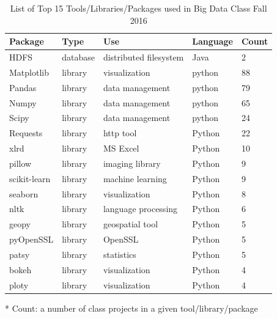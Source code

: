 \documentclass[9pt,twocolumn,twoside]{styles/osajnl}
\begin{document}
\begin{table}[htb]
\begin{center}
\begin{small}
\begin{threeparttable}
\begin{tabular}{l|l|l|l|l}
    Package      & Type     & Use                    & Language & Count\tnote{*} \\ \hline \hline
    HDFS         & database & distributed filesystem & Java     & 2              \\ 
    Matplotlib   & library  & visualization          & python   & 88             \\ \hline
    Pandas       & library  & data management        & python   & 79             \\ \hline
    Numpy        & library  & data management        & python   & 65             \\ \hline
    Scipy        & library  & data management        & python   & 24             \\ \hline
    Requests     & library  & http tool              & Python   & 22             \\ \hline
    xlrd         & library  & MS Excel               & Python   & 10             \\ \hline
    pillow       & library  & imaging library        & Python   & 9              \\ \hline
    scikit-learn & library  & machine learning       & Python   & 9              \\ \hline
    seaborn      & library  & visualization          & Python   & 8              \\ \hline
    nltk         & library  & language processing    & Python   & 6              \\ \hline
    geopy        & library  & geospatial tool        & Python   & 5              \\ \hline
    pyOpenSSL    & library  & OpenSSL                & Python   & 5              \\ \hline
    patsy        & library  & statistics             & Python   & 5              \\ \hline
    bokeh        & library  & visualization          & Python   & 4              \\ \hline
    ploty        & library  & visualization          & Python   & 4              \\ \hline

        \end{tabular}
        \caption{List of Top 15 Tools/Libraries/Packages used in Big
          Data Class Fall 2016}
        \label{tab:tools-sp16}
        \begin{tablenotes}
        \item[*] Count: a number of class projects in a given tool/library/package
        \end{tablenotes}
      \end{threeparttable}
    \end{small}
  \end{center}
\end{table}
\end{document}
